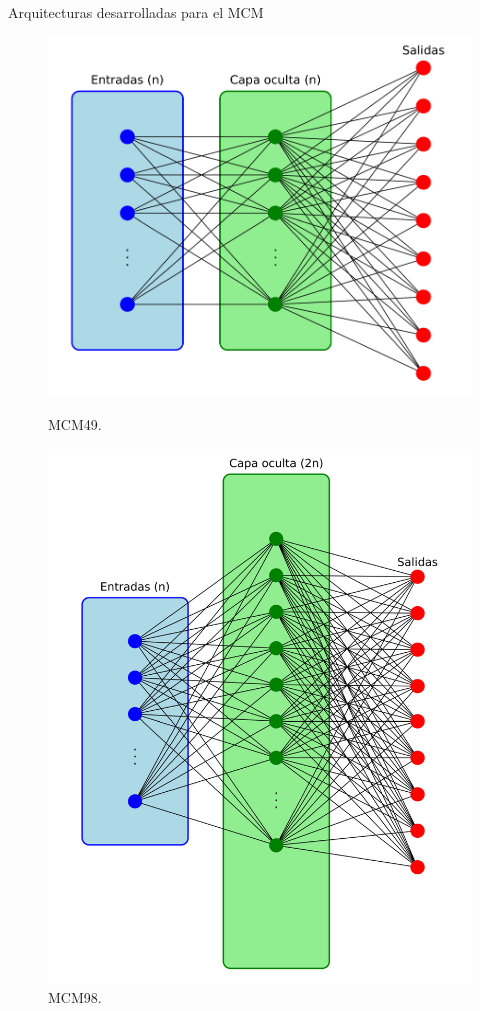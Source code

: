 \begin{frame}{Arquitecturas desarrolladas para el MCM}
\begin{figure}[H]
{	    \begin{minipage}{0.3\textwidth}
    			\centering
		    \includegraphics[width=\linewidth]{../Memoria/img/modelo/arquitecturas/arqnMUL.pdf}
		    \caption{MCM49.}
	    \end{minipage}	
	    \hspace{.5cm}
	        
	    \begin{minipage}{0.3\textwidth}
    			\centering
		    \includegraphics[width=\linewidth]{../Memoria/img/modelo/arquitecturas/arqnnMUL.pdf}
		    \caption{MCM98.}
	    \end{minipage}
	    }
	\end{figure}
	

\end{frame}
